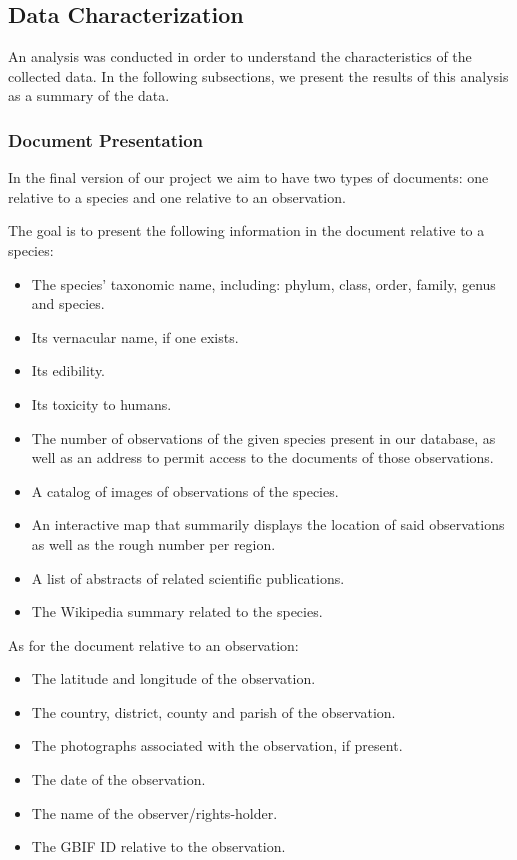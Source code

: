 \subsection{Data Characterization}



An analysis was conducted in order to understand the characteristics of the collected data. In the following subsections, we present the results of this analysis as a summary of the data.

\subsubsection{\textbf{Document Presentation}}

In the final version of our project we aim to have two types of documents: one relative to a species and one relative to an observation.

The goal is to present the following information in the document relative to a species:
\begin{itemize}
    \item The species' taxonomic name, including: phylum, class, order, family, genus and species.
    \item Its vernacular name, if one exists.
    \item Its edibility.
    \item Its toxicity to humans.
    \item The number of observations of the given species present in our database, as well as an address to permit access to the documents of those observations.
    \item A catalog of images of observations of the species.
    \item An interactive map that summarily displays the location of said observations as well as the rough number per region.
    \item A list of abstracts of related scientific publications.
    \item The Wikipedia summary related to the species.
\end{itemize}

As for the document relative to an observation:
\begin{itemize}
    \item The latitude and longitude of the observation.
    \item The country, district, county and parish of the observation.
    \item The photographs associated with the observation, if present.
    \item The date of the observation.
    \item The name of the observer/rights-holder.
    \item The GBIF ID relative to the observation.
\end{itemize}

